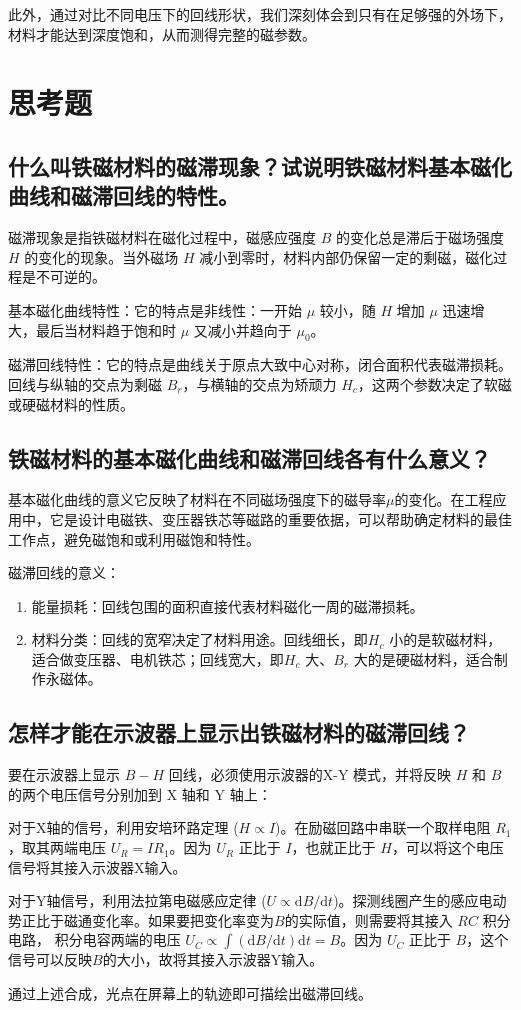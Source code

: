 \documentclass{../template/Report}%
\begin{document}
\begin{fullreportonly}
    此外，通过对比不同电压下的回线形状，我们深刻体会到只有在足够强的外场下，材料才能达到深度饱和，从而测得完整的磁参数。

    \section{思考题}

    \subsection{什么叫铁磁材料的磁滞现象？试说明铁磁材料基本磁化曲线和磁滞回线的特性。}
    磁滞现象是指铁磁材料在磁化过程中，磁感应强度 $B$ 的变化总是滞后于磁场强度 $H$ 的变化的现象。当外磁场 $H$ 减小到零时，材料内部仍保留一定的剩磁，磁化过程是不可逆的。

    基本磁化曲线特性：它的特点是非线性：一开始 $\mu$ 较小，随 $H$ 增加 $\mu$ 迅速增大，最后当材料趋于饱和时 $\mu$ 又减小并趋向于 $\mu_0$。

    磁滞回线特性：它的特点是曲线关于原点大致中心对称，闭合面积代表磁滞损耗。回线与纵轴的交点为剩磁 $B_r$，与横轴的交点为矫顽力 $H_c$，这两个参数决定了软磁或硬磁材料的性质。

    \subsection{铁磁材料的基本磁化曲线和磁滞回线各有什么意义？}
    基本磁化曲线的意义它反映了材料在不同磁场强度下的磁导率$\mu$的变化。在工程应用中，它是设计电磁铁、变压器铁芯等磁路的重要依据，可以帮助确定材料的最佳工作点，避免磁饱和或利用磁饱和特性。

    磁滞回线的意义：
    \begin{enumerate}
        \item 能量损耗：回线包围的面积直接代表材料磁化一周的磁滞损耗。
        \item 材料分类：回线的宽窄决定了材料用途。回线细长，即$H_c$ 小的是软磁材料，适合做变压器、电机铁芯；回线宽大，即$H_c$ 大、$B_r$ 大的是硬磁材料，适合制作永磁体。
    \end{enumerate}

    \subsection{怎样才能在示波器上显示出铁磁材料的磁滞回线？}
    要在示波器上显示 $B-H$ 回线，必须使用示波器的X-Y 模式，并将反映 $H$ 和 $B$ 的两个电压信号分别加到 X 轴和 Y 轴上：

    对于X轴的信号，利用安培环路定理 ($H \propto I$)。在励磁回路中串联一个取样电阻 $R_1$，取其两端电压 $U_R = I R_1$。因为 $U_R$ 正比于 $I$，也就正比于 $H$，可以将这个电压信号将其接入示波器X输入。

    对于Y轴信号，利用法拉第电磁感应定律 ($U \propto \mathrm{d}B/\mathrm{d}t$)。探测线圈产生的感应电动势正比于磁通变化率。如果要把变化率变为$B$的实际值，则需要将其接入 $RC$ 积分电路，
    积分电容两端的电压 $U_C \propto \int (\mathrm{d}B/\mathrm{d}t) \mathrm{d}t = B$。因为 $U_C$ 正比于 $B$，这个信号可以反映$B$的大小，故将其接入示波器Y输入。

    通过上述合成，光点在屏幕上的轨迹即可描绘出磁滞回线。
\end{fullreportonly}
\insertnotes
\end{document}
